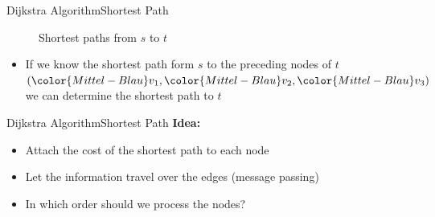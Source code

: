 
\begin{frame}{Dijkstra Algorithm}{Shortest Path}
  \begin{figure}%
    \begin{adjustbox}{width=0.75\linewidth}%
    \end{adjustbox}%
    \vspace{-1.0em}
    \label{fig:dijkstra:shortest_paths_introduction}%
    \caption{Shortest paths from {\color{Mittel-Blau}$s$} to
      {\color{Mittel-Blau}$t$}}
  \end{figure}
  \vspace{-1.0em}
  \begin{itemize}
    \item
      If we know the shortest path form {\color{Mittel-Blau}$s$}
      to the preceding nodes of {\color{Mittel-Blau}$t$}
      \begin{math}
        (
          {\color{Mittel-Blau}v_1},
          {\color{Mittel-Blau}v_2},
          {\color{Mittel-Blau}v_3}
        )
       \end{math}
       we can determine the shortest path to {\color{Mittel-Blau}$t$}
   \end{itemize}
\end{frame}


\begin{frame}{Dijkstra Algorithm}{Shortest Path}
  \textbf{Idea:}
  \begin{itemize}
    \item
      Attach the cost of the shortest path to each node
    \item
      Let the information travel over the edges (message passing)
    \item
      In which order should we process the nodes?
  \end{itemize}
\end{frame}


